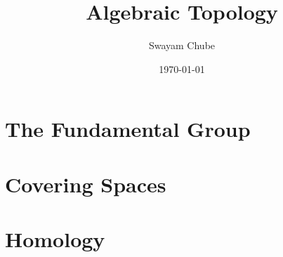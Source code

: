 \documentclass[oneside]{report}
\title{Algebraic Topology}
\author{Swayam Chube}
\date{\today}
\begin{document}
\maketitle
\tableofcontents

\chapter{The Fundamental Group}


\chapter{Covering Spaces}


\chapter{Homology}





\listoftodos
\end{document}
